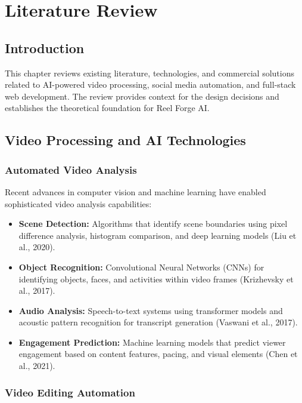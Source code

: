 \chapter{Literature Review}

\section{Introduction}

This chapter reviews existing literature, technologies, and commercial solutions related to AI-powered video processing, social media automation, and full-stack web development. The review provides context for the design decisions and establishes the theoretical foundation for Reel Forge AI.

\section{Video Processing and AI Technologies}

\subsection{Automated Video Analysis}

Recent advances in computer vision and machine learning have enabled sophisticated video analysis capabilities:

\begin{itemize}
    \item \textbf{Scene Detection:} Algorithms that identify scene boundaries using pixel difference analysis, histogram comparison, and deep learning models (Liu et al., 2020).
    
    \item \textbf{Object Recognition:} Convolutional Neural Networks (CNNs) for identifying objects, faces, and activities within video frames (Krizhevsky et al., 2017).
    
    \item \textbf{Audio Analysis:} Speech-to-text systems using transformer models and acoustic pattern recognition for transcript generation (Vaswani et al., 2017).
    
    \item \textbf{Engagement Prediction:} Machine learning models that predict viewer engagement based on content features, pacing, and visual elements (Chen et al., 2021).
\end{itemize}

\subsection{Video Editing Automation}

